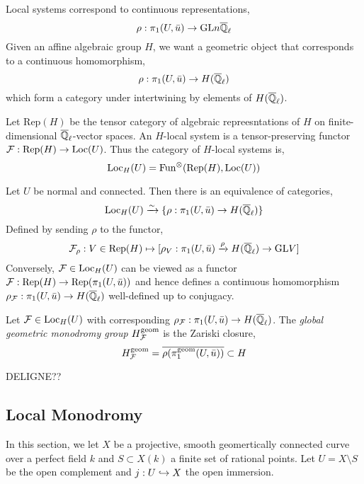 \documentclass[12pt]{article}
\begin{document}
\begin{rmk}
Local systems correspond to continuous representations,
\[ \rho : \pi_1(U, \bar{u}) \to \mathrm{GL}{n}{\overline{\mathbb{Q}}_\ell} \]
Given an affine algebraic group $H$, we want a geometric object that corresponds to a continuous homomorphism,
\[ \rho : \pi_1(U, \bar{u}) \to H(\overline{\mathbb{Q}}_\ell) \]
which form a category under intertwining by elements of $H(\overline{\mathbb{Q}}_\ell)$. 
\end{rmk}

\renewcommand{\Rep}{\mathrm{Rep}}

\begin{defn}
Let $\Rep(H)$ be the tensor category of algebraic repreesntations of $H$ on finite-dimensional $\overline{\mathbb{Q}}_\ell$-vector spaces. An $H$-local system is a tensor-preserving functor $\F : \Rep(H) \to \Loc(U)$. Thus the category of $H$-local systems is,
\[ \Loc_H(U) = \mathrm{Fun}^{\otimes}(\Rep(H), \Loc(U)) \]
\end{defn}

\begin{thm}
Let $U$ be normal and connected. Then there is an equivalence of categories,
\[ \mathrm{Loc}_H(U) \xrightarrow{\sim} \{ \rho : \pi_1(U, \bar{u}) \to H(\overline{\mathbb{Q}}_\ell) \} \]
Defined by sending $\rho$ to the functor,
\[ \F_\rho : V \in \Rep(H) \mapsto [\rho_V : \pi_1(U, \bar{u}) \xrightarrow{\rho} H(\Qbar_\ell) \to \GL{}{V} ] \]
Conversely, $\mathcal{F} \in \mathrm{Loc}_H(U)$ can be viewed as a functor $\F : \Rep(H) \to \Rep(\pi_1(U, \bar{u}))$ and hence defines a continuous homomorphism $\rho_{\mathcal{F}} : \pi_1(U, \bar{u}) \to H(\overline{\mathbb{Q}}_\ell)$ well-defined up to conjugacy.
\end{thm}

\begin{defn}
Let $\mathcal{F} \in \mathrm{Loc}_H(U)$ with corresponding $\rho_{\mathcal{F}} : \pi_1(U, \bar{u}) \to H(\overline{\mathbb{Q}}_\ell)$. The \textit{global geometric monodromy group} $H^{\mathrm{geom}}_{\mathcal{F}}$ is the Zariski closure,
\[ H^{\mathrm{geom}}_{\mathcal{F}} = \overline{\rho(\pi_1^{\mathrm{geom}}(U, \bar{u}))} \subset H \]
\end{defn}

\begin{thm}
DELIGNE??
\end{thm}

\subsection{Local Monodromy}

\newcommand{\ur}{\mathrm{ur}}

\begin{rmk}
In this section, we let $X$ be a projective, smooth geomertically connected curve over a perfect field $k$ and $S \subset X(k)$ a finite set of rational points. Let $U = X \setminus S$   be the open complement and $j : U \hookrightarrow X$ the open immersion. 
\end{rmk}
\end{document}
